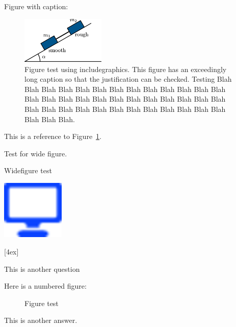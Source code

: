\documentclass[solutionsatend,twocolumnsolutions]{ouunit}
\begin{document}
Figure with caption:
\begin{figure}
\caption{Figure test using includegraphics\label{fig-test-includegraphics}. This figure has an exceedingly long caption so that the justification can be checked. Testing Blah Blah Blah Blah Blah Blah Blah Blah Blah Blah Blah Blah Blah Blah Blah Blah Blah Blah Blah Blah Blah Blah Blah Blah Blah Blah Blah Blah Blah Blah Blah Blah Blah Blah Blah Blah Blah Blah Blah Blah.}\label{fig-test-tikz}
\includegraphics[width=4cm]{test}
\end{figure}

This is a reference to Figure~\ref{fig-test-tikz}.

Test for wide figure.

\lipsum[134]

\begin{widefigure}[needspace=2.5in]%
\caption{Widefigure test\label{fig-test-widefigure-one}}
\end{widefigure}


\lipsum[134]
\begin{marginfigure*}
\includegraphics[width=3cm]{icon}
\end{marginfigure*}
[4ex]

\lipsum[133]

\begin{exercise}\label{exe-fig-test}
This is another question
\begin{solution}
Here is a numbered figure:
\begin{figure}
\caption{Figure test \label{fig-placement-test}}
\end{figure}
This is another answer.
\end{solution}
\end{exercise}
\end{document}
